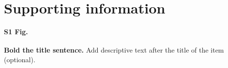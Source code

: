 \documentclass[10pt,letterpaper]{article}
\begin{document}
\section*{Supporting information}

\paragraph*{S1 Fig.}
\label{S1_Fig}
{\bf Bold the title sentence.} Add descriptive text after the title of the item (optional).



\nolinenumbers

%
%
% 


{}





\end{document}
